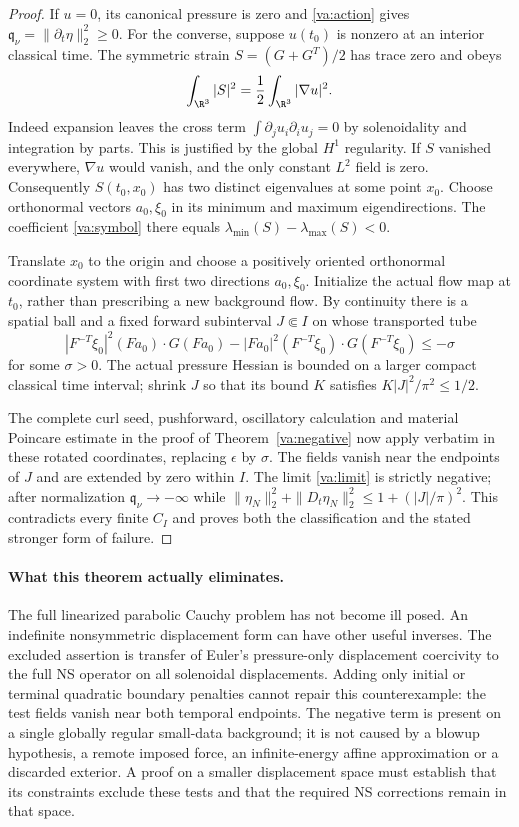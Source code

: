 \begin{proof}
If $u=0$, its canonical pressure is zero and \eqref{va:action} gives
$\mathfrak q_\nu=\|\partial_t\eta\|_2^2\ge0$.
For the converse, suppose $u(t_0)$ is nonzero at an interior classical time.
The symmetric strain $S=(G+G^T)/2$ has trace zero and obeys
\[
 \int_{\R^3}|S|^2=\frac12\int_{\R^3}|\nabla u|^2.
\]
Indeed expansion leaves the cross term
$\int\partial_j u_i\partial_i u_j=0$ by solenoidality and integration by
parts. This is justified by the global $H^1$ regularity. If $S$ vanished
everywhere, $\nabla u$ would vanish, and the only constant $L^2$ field is zero.
Consequently $S(t_0,x_0)$ has two distinct eigenvalues at some point $x_0$.
Choose orthonormal vectors $a_0,\xi_0$ in its minimum and maximum
eigendirections. The coefficient \eqref{va:symbol} there equals
$\lambda_{\min}(S)-\lambda_{\max}(S)<0$.

Translate $x_0$ to the origin and choose a positively oriented orthonormal
coordinate system with first two directions $a_0,\xi_0$. Initialize the
actual flow map at $t_0$, rather than prescribing a new background flow.
By continuity there is a spatial ball and a fixed forward subinterval
$J\Subset I$ on whose transported tube
\[
 |F^{-T}\xi_0|^2(Fa_0)\cdot G(Fa_0)
       -|Fa_0|^2(F^{-T}\xi_0)\cdot G(F^{-T}\xi_0)\le-\sigma
\]
for some $\sigma>0$. The actual pressure Hessian is bounded on a larger
compact classical time interval; shrink $J$ so that its bound $K$ satisfies
$K|J|^2/\pi^2\le1/2$.

The complete curl seed, pushforward, oscillatory calculation and material
Poincare estimate in the proof of Theorem~\ref{va:negative} now apply
verbatim in these rotated coordinates, replacing $\epsilon$ by $\sigma$.
The fields vanish near the endpoints of $J$ and are extended by zero within
$I$. The limit \eqref{va:limit} is strictly negative; after normalization
$\mathfrak q_\nu\to-\infty$ while
$\|\eta_N\|_2^2+\|D_t\eta_N\|_2^2\le1+(|J|/\pi)^2$.
This contradicts every finite $C_I$ and proves both the classification and
the stated stronger form of failure.
\end{proof}

\paragraph{What this theorem actually eliminates.}
The full linearized parabolic Cauchy problem has not become ill posed.
An indefinite nonsymmetric displacement form can have other useful inverses.
The excluded assertion is transfer of Euler's pressure-only displacement
coercivity to the full NS operator on all solenoidal displacements. Adding
only initial or terminal quadratic boundary penalties cannot repair this
counterexample: the test fields vanish near both temporal endpoints.
The negative term is present on a single globally regular small-data
background; it is not caused by a blowup hypothesis, a remote imposed force,
an infinite-energy affine approximation or a discarded exterior.
A proof on a smaller displacement space must establish that its constraints
exclude these tests and that the required NS corrections remain in that space.

